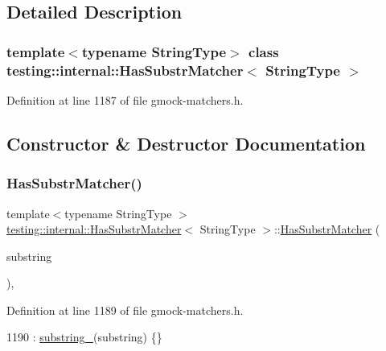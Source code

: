 \subsection{Detailed Description}
\subsubsection*{template$<$typename String\+Type$>$\newline
class testing\+::internal\+::\+Has\+Substr\+Matcher$<$ String\+Type $>$}



Definition at line 1187 of file gmock-\/matchers.\+h.



\subsection{Constructor \& Destructor Documentation}
\mbox{\label{classtesting_1_1internal_1_1HasSubstrMatcher_a395efacb13a89e5010b9ec4a00a16f00}} 
\subsubsection{\texorpdfstring{Has\+Substr\+Matcher()}{HasSubstrMatcher()}}
{\footnotesize\ttfamily template$<$typename String\+Type $>$ \\
\hyperlink{classtesting_1_1internal_1_1HasSubstrMatcher}{testing\+::internal\+::\+Has\+Substr\+Matcher}$<$ String\+Type $>$\+::\hyperlink{classtesting_1_1internal_1_1HasSubstrMatcher}{Has\+Substr\+Matcher} (\begin{DoxyParamCaption}\item[{const String\+Type \&}]{substring }\end{DoxyParamCaption})\hspace{0.3cm}{\ttfamily [inline]}, {\ttfamily [explicit]}}



Definition at line 1189 of file gmock-\/matchers.\+h.


\begin{DoxyCode}
1190       : \hyperlink{classtesting_1_1internal_1_1HasSubstrMatcher_ac15185527d4f52eda4574c8b845a52f3}{substring\_}(substring) \{\}
\end{DoxyCode}



